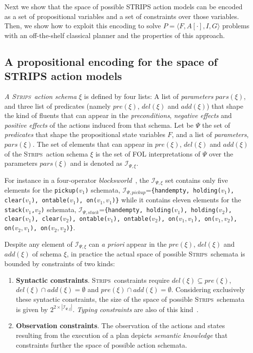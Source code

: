 \documentclass{article}
\newcommand{\tup}[1]{{\langle #1 \rangle}}
\newcommand{\strips}{\textsc{Strips}}
\begin{document}
Next we show that the space of possible STRIPS action models can be encoded as a set of propositional variables and a set of constraints over those variables. Then, we show how to exploit this encoding to solve $P=\tup{F,A[\cdot],I,G}$ problems with an off-the-shelf classical planner and the properties of this approach.


\subsection{A propositional encoding for the space of STRIPS action models}
{\em A \strips\ action schema} $\xi$ is defined by four lists: A list of {\em parameters} $pars(\xi)$, and three list of predicates (namely $pre(\xi)$, $del(\xi)$ and $add(\xi)$) that shape the kind of fluents that can appear in the {\em preconditions}, {\em negative effects} and {\em positive effects} of the actions induced from that schema. Let be $\Psi$ the set of {\em predicates} that shape the propositional state variables $F$, and a list of {\em parameters}, $pars(\xi)$. The set of elements that can appear in $pre(\xi)$, $del(\xi)$ and $add(\xi)$ of the \strips\ action schema $\xi$ is the set of FOL interpretations of $\Psi$ over the parameters $pars(\xi)$ and is denoted as ${\mathcal I}_{\Psi,\xi}$.

For instance in a four-operator {\em blocksworld}~\cite{slaney2001blocks}, the ${\mathcal I}_{\Psi,\xi}$ set contains only five elements for the {\small \tt pickup($v_1$)} schemata, ${\mathcal I}_{\Psi,pickup}$={\small\tt\{handempty, holding($v_1$), clear($v_1$), ontable($v_1$), on($v_1,v_1$)\}} while it contains eleven elements for the {\small \tt stack($v_1$,$v_2$)} schemata, ${\mathcal I}_{\Psi,stack}$={\small\tt\{handempty, holding($v_1$), holding($v_2$), clear($v_1$), clear($v_2$), ontable($v_1$), ontable($v_2$), on($v_1,v_1$), on($v_1,v_2$), on($v_2,v_1$), on($v_2,v_2$)\}}. 

Despite any element of ${\mathcal I}_{\Psi,\xi}$ can {\em a priori} appear in the $pre(\xi)$, $del(\xi)$ and $add(\xi)$ of schema $\xi$, in practice the actual space of possible \strips\ schemata is bounded by constraints of two kinds:
\begin{enumerate}
\item {\bf Syntactic constraints}. \strips\ constraints require $del(\xi)\subseteq pre(\xi)$, $del(\xi)\cap add(\xi)=\emptyset$ and $pre(\xi)\cap add(\xi)=\emptyset$. Considering exclusively these syntactic constraints, the size of the space of possible \strips\ schemata is given by $2^{2\times|{\mathcal I}_{\Psi,\xi}|}$. {\em Typing constraints} are also of this kind~\cite{mcdermott1998pddl}. 
\item {\bf Observation constraints}. The observation of the actions and states resulting from the execution of a plan depicts {\em semantic knowledge} that constraints further the space of possible action schemata.   
\end{enumerate}
\end{document}
